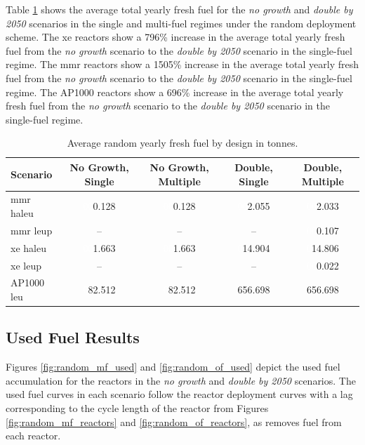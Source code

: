 Table \ref{tab:random_fresh_avg} shows the average total yearly fresh fuel for the \textit{no growth} and \textit{double by 2050} scenarios in the single and multi-fuel regimes under the random deployment scheme. The \gls{xe} reactors show a 796\% increase in the average total yearly fresh fuel from the \textit{no growth} scenario to the \textit{double by 2050} scenario in the single-fuel regime. The \gls{mmr} reactors show a 1505\% increase in the average total yearly fresh fuel from the \textit{no growth} scenario to the \textit{double by 2050} scenario in the single-fuel regime. The AP1000 reactors show a 696\% increase in the average total yearly fresh fuel from the \textit{no growth} scenario to the \textit{double by 2050} scenario in the single-fuel regime.

\begin{table}[H]
    \centering
    \caption{Average random yearly fresh fuel by design in tonnes.}
    \label{tab:random_fresh_avg}
    \begin{tabular}{l c c c c}
       \hline
       Scenario & No Growth, Single & No Growth, Multiple & Double, Single & Double, Multiple  \\
       \hline
       \gls{mmr} \gls{haleu}   & \textcolor{white}{00}0.128    & \textcolor{white}{00}0.128   & \textcolor{white}{00}2.055    & \textcolor{white}{00}2.033    \\
       \gls{mmr} \gls{leup}    & --       & --      & --       & \textcolor{white}{00}0.107    \\
       \gls{xe} \gls{haleu}    & \textcolor{white}{00}1.663    & \textcolor{white}{00}1.663   & \textcolor{white}{0}14.904   & \textcolor{white}{0}14.806   \\
       \gls{xe} \gls{leup}     & --       & --      & --       & \textcolor{white}{00}0.022    \\
       AP1000 \gls{leu}        & \textcolor{white}{0}82.512   & \textcolor{white}{0}82.512  & 656.698  & 656.698  \\
       \hline
    \end{tabular}
\end{table}





\subsection{Used Fuel Results}
\label{sec:random_used}

Figures \ref{fig:random_mf_used} and \ref{fig:random_of_used} depict the used fuel accumulation for the reactors in the \textit{no growth} and \textit{double by 2050} scenarios. The used fuel curves in each scenario follow the reactor deployment curves with a lag corresponding to the cycle length of the reactor from Figures \ref{fig:random_mf_reactors} and \ref{fig:random_of_reactors}, as \cyclus removes fuel from each reactor.



